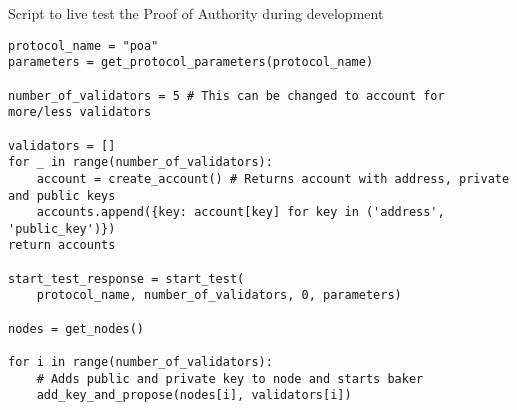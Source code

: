 \begin{listing}[H]
\caption{Script to live test the Proof of Authority during development}
\label{lst:python_code}
\begin{verbatim}
protocol_name = "poa"
parameters = get_protocol_parameters(protocol_name)

number_of_validators = 5 # This can be changed to account for more/less validators

validators = []
for _ in range(number_of_validators):
    account = create_account() # Returns account with address, private and public keys
    accounts.append({key: account[key] for key in ('address', 'public_key')})
return accounts

start_test_response = start_test(
    protocol_name, number_of_validators, 0, parameters)

nodes = get_nodes() 

for i in range(number_of_validators):
    # Adds public and private key to node and starts baker
    add_key_and_propose(nodes[i], validators[i])
\end{verbatim}
\end{listing}




